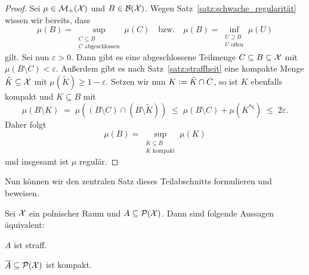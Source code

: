 \documentclass[../main/main.tex]{subfiles}
\begin{document}
	\begin{proof}
		Sei $\mu \in \mathcal{M}_{+}(\mathcal{X})$ und $B \in \mathcal{B}(\mathcal{X})$. 
		Wegen Satz~\ref{satz:schwache_regularität} wissen wir bereits, dass 
		\[\mu(B) = \sup_{\substack{C \subseteq B \\ C \text{ abgeschlossen}}} \mu(C) 
		\quad \text{bzw.} \quad \mu(B) = \inf_{\substack{U \supseteq B \\ U \text{ offen}}} 
		\mu(U)\]
		gilt. Sei nun $\varepsilon > 0$. Dann gibt es eine abgeschlossene Teilmenge 
		$C \subseteq B \subseteq \mathcal{X}$ mit $\mu(B \setminus C) < \varepsilon$. 
		Außerdem gibt es nach Satz~\ref{satz:straffheit} eine kompakte Menge 
		$\tilde{K} \subseteq \mathcal{X}$ mit $\mu(\tilde{K}) \geq 1 - \varepsilon$. Setzen 
		wir nun $K \vcentcolon = \tilde{K} \cap C$, so ist $K$ ebenfalls kompakt und 
		$K \subseteq B$ mit 
		\[ \mu(B \setminus K) 
		\; = \; \mu((B \setminus C) \cap (B \setminus \tilde{K})) 
		\; \leq \; \mu(B \setminus C) + \mu(K^{\ast \mathsf{c}}) 
		\; \leq \; 2 \varepsilon \text{.} \]
		Daher folgt 
		\[\mu(B) 
		= \sup_{\substack{K \subseteq B \\ K \text{ kompakt}}} \mu(K)\] 
		und insgesamt ist $\mu$ regulär.
	\end{proof}
	
	Nun können wir den zentralen Satz dieses Teilabschnitts formulieren und beweisen.
	
	\begin{Satz}[Prokhorov]
		\label{satz:prokhorov}
		Sei $\mathcal{X}$ ein polnischer Raum und $A \subseteq \mathcal{P}(\mathcal{X})$. Dann sind folgende Aussagen äquivalent:
		\begin{equivalentthm}
			\item $A$ ist straff.
			\item $\overline{A} \subseteq \mathcal{P}(\mathcal{X})$ ist kompakt.
		\end{equivalentthm}
	\end{Satz}
	
\end{document}
